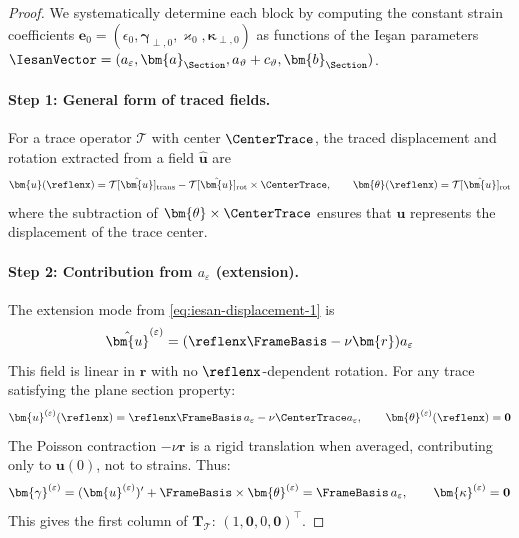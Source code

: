 \begin{proof}
We systematically determine each block by computing the constant strain 
coefficients $\bm{e}_0 = (\epsilon_{0}, \bm{\gamma}_{\perp,0}, \varkappa_0, \bm{\kappa}_{\perp,0})$ 
as functions of the Ieşan parameters $\IesanVector = (a_\varepsilon, \bm{a}_{\Section}, a_\vartheta + c_\vartheta, \bm{b}_{\Section})$.

\paragraph{Step 1: General form of traced fields.}
For a trace operator $\mathcal{T}$ with center $\CenterTrace$, 
the traced displacement and rotation extracted from a field $\hat{\bm{u}}$ are
\begin{equation}
\bm{u}(\reflenx) = \mathcal{T}[\hat{\bm{u}}]_{\rm trans} - \mathcal{T}[\hat{\bm{u}}]_{\rm rot} \times \CenterTrace, 
\qquad 
\bm{\theta}(\reflenx) = \mathcal{T}[\hat{\bm{u}}]_{\rm rot}
\label{eq:traced-fields-general}
\end{equation}
where the subtraction of $\bm{\theta} \times \CenterTrace$ ensures that 
$\bm{u}$ represents the displacement of the trace center.

\paragraph{Step 2: Contribution from $a_\varepsilon$ (extension).}
The extension mode from \eqref{eq:iesan-displacement-1} is
\begin{equation*}
\hat{\bm{u}}^{(\varepsilon)} = (\reflenx \FrameBasis - \nu \bm{r}) a_\varepsilon
\end{equation*}
This field is linear in $\bm{r}$ with no $\reflenx$-dependent rotation. 
For any trace satisfying the plane section property:
\begin{equation*}
\bm{u}^{(\varepsilon)}(\reflenx) = \reflenx \FrameBasis \, a_\varepsilon - \nu \CenterTrace a_\varepsilon, 
\qquad 
\bm{\theta}^{(\varepsilon)}(\reflenx) = \mathbf{0}
\end{equation*}
The Poisson contraction $-\nu \bm{r}$ is a rigid translation when averaged, 
contributing only to $\bm{u}(0)$, not to strains. Thus:
\begin{equation*}
\bm{\gamma}^{(\varepsilon)} = (\bm{u}^{(\varepsilon)})' + \FrameBasis \times \bm{\theta}^{(\varepsilon)} 
= \FrameBasis \, a_\varepsilon, 
\qquad 
\bm{\kappa}^{(\varepsilon)} = \mathbf{0}
\end{equation*}
This gives the first column of $\mathbf{T}_{\mathcal{T}}$: $(1, \mathbf{0}, 0, \mathbf{0})^\top$.


\end{proof}

